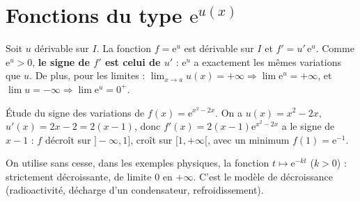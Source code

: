 \section{Fonctions du type $\mathrm{e}^{u(x)}$}

\begin{propriete}
Soit $u$ dérivable sur $I$. La fonction $f=\mathrm{e}^{u}$ est dérivable sur $I$ et
$f'=u'\,\mathrm{e}^{u}$. Comme $\mathrm{e}^{u}>0$, \textbf{le signe de $f'$ est celui de $u'$} :
$\mathrm{e}^{u}$ a exactement les mêmes variations que $u$. De plus, pour les limites :
$\displaystyle\lim_{x\to a}u(x)=+\infty\Rightarrow\lim\mathrm{e}^{u}=+\infty$, et
$\lim u=-\infty\Rightarrow\lim\mathrm{e}^{u}=0^{+}$.
\end{propriete}

\begin{exemple}
Étude du signe des variations de $f(x)=\mathrm{e}^{x^{2}-2x}$. On a $u(x)=x^{2}-2x$,
$u'(x)=2x-2=2(x-1)$, donc $f'(x)=2(x-1)\mathrm{e}^{x^{2}-2x}$ a le signe de $x-1$ :
$f$ décroît sur $]-\infty,1]$, croît sur $[1,+\infty[$, avec un minimum
$f(1)=\mathrm{e}^{-1}$.
\end{exemple}

\begin{remarque}
On utilise sans cesse, dans les exemples physiques, la fonction $t\mapsto \mathrm{e}^{-kt}$
($k>0$) : strictement décroissante, de limite $0$ en $+\infty$. C'est le modèle de
décroissance (radioactivité, décharge d'un condensateur, refroidissement).
\end{remarque}

\begin{illus}
\end{illus}

